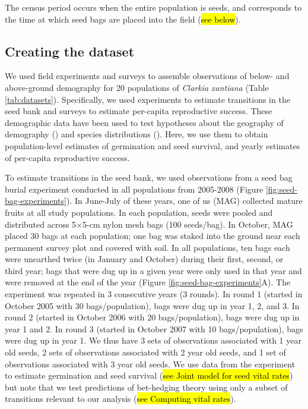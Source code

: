 \documentclass[12pt, oneside]{article}   	%
\begin{document}
The census period occurs when the entire population is seeds, and corresponds to the time at which seed bags are placed into the field (\hl{see below}).
\fi

\subsection{Creating the dataset}

We used field experiments and surveys to assemble observations of below- and above-ground demography for 20 populations of \textit{Clarkia xantiana} (Table \ref{tab:datasets}). Specifically, we used experiments to estimate transitions in the seed bank and surveys to estimate per-capita reproductive success. These demographic data have been used to test hypotheses about the geography of demography (\cite{eckhart2011}) and species distributions (\cite{pironon2018}). Here, we use them to obtain population-level estimates of germination and seed survival, and yearly estimates of per-capita reproductive success.

To estimate transitions in the seed bank, we used observations from a seed bag burial experiment conducted in all populations from 2005-2008 (Figure \ref{fig:seed-bag-experiments}). In June-July of these years, one of us (MAG) collected mature fruits at all study populations. In each population, seeds were pooled and distributed across 5$\times$5-cm nylon mesh bags (100 seeds/bag). In October, MAG placed 30 bags at each population; one bag was staked into the ground near each permanent survey plot and covered with soil. In all populations, ten bags each were unearthed twice (in January and October) during their first, second, or third year; bags that were dug up in a given year were only used in that year and were removed at the end of the year (Figure \ref{fig:seed-bag-experiments}A). The experiment was repeated in 3 consecutive years (3 rounds). In round 1 (started in October 2005 with 30 bags/population), bags were dug up in year 1, 2, and 3. In round 2 (started in October 2006 with 20 bags/population), bags were dug up in year 1 and 2. In round 3 (started in October 2007 with 10 bags/population), bags were dug up in year 1. We thus have 3 sets of observations associated with 1 year old seeds, 2 sets of observations associated with 2 year old seeds, and 1 set of observations associated with 3 year old seeds. We use data from the experiment to estimate germination and seed survival (\hl{see Joint model for seed vital rates}) but note that we test predictions of bet-hedging theory using only a subset of transitions relevant to our analysis (\hl{see Computing vital rates}).
\end{document}
